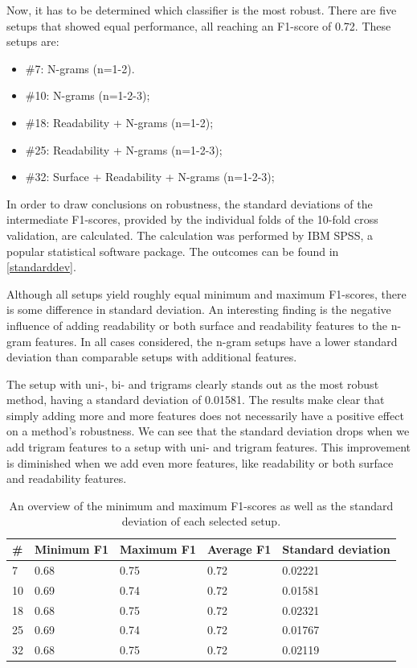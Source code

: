 \documentclass[
10pt, %
a4paper, %
oneside, %
headinclude,footinclude, %
] {book}%
\begin{document}
Now, it has to be determined which classifier is the most robust. There are five setups that showed equal performance, all reaching an F1-score of 0.72. These setups are:
\begin{itemize}
\item \#7: N-grams (n=1-2).
\item \#10: N-grams (n=1-2-3);
\item \#18: Readability + N-grams (n=1-2);
\item \#25: Readability + N-grams (n=1-2-3);
\item \#32: Surface + Readability + N-grams (n=1-2-3);
\end{itemize}

In order to draw conclusions on robustness, the standard deviations of the intermediate F1-scores, provided by the individual folds of the 10-fold cross validation, are calculated. The calculation was performed by IBM SPSS, a popular statistical software package. The outcomes can be found in \autoref{standarddev}.

Although all setups yield roughly equal minimum and maximum F1-scores, there is some difference in standard deviation. An interesting finding is the negative influence of adding readability or both surface and readability features to the n-gram features. In all cases considered, the n-gram setups have a lower standard deviation than comparable setups with additional features.

The setup with uni-, bi- and trigrams clearly stands out as the most robust method, having a standard deviation of 0.01581. The results make clear that simply adding more and more features does not necessarily have a positive effect on a method's robustness. We can see that the standard deviation drops when we add trigram features to a setup with uni- and trigram features. This improvement is diminished when we add even more features, like readability or both surface and readability features. 


\begin{table}[]
\caption{An overview of the minimum and maximum F1-scores as well as the standard deviation of each selected setup.}
\label{standarddev}
\begin{tabular}{@{}lllll@{}}
\toprule
\textbf{\#} & \textbf{Minimum F1} & \textbf{Maximum F1} & \textbf{Average F1} & \textbf{Standard deviation} \\ \midrule
7                    & 0.68             & 0.75             & 0.72             & 0.02221                     \\
10                   & 0.69             & 0.74             & 0.72             & 0.01581                     \\
18                   & 0.68             & 0.75             & 0.72             & 0.02321                    \\
25                   & 0.69             & 0.74             & 0.72             & 0.01767                     \\
32                   & 0.68             & 0.75             & 0.72             & 0.02119                     \\ \bottomrule
\end{tabular}
\end{table}
\end{document}
